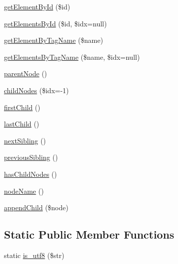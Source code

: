 \begin{DoxyCompactItemize}
\hyperlink{classsimple__html__dom__node_aec6ca41b9859728595ece521ca638e48}{get\+Element\+By\+Id} (\$id)
\item 
\hyperlink{classsimple__html__dom__node_a12433180a44804217a6089284c1e337a}{get\+Elements\+By\+Id} (\$id, \$idx=null)
\item 
\hyperlink{classsimple__html__dom__node_a73eb6caf89c86044a5ed0092484f375d}{get\+Element\+By\+Tag\+Name} (\$name)
\item 
\hyperlink{classsimple__html__dom__node_a7d6c89e0ea53cd3866bb03eac8ef300d}{get\+Elements\+By\+Tag\+Name} (\$name, \$idx=null)
\item 
\hyperlink{classsimple__html__dom__node_a38cacd4491f3f41cf275df362bb64c06}{parent\+Node} ()
\item 
\hyperlink{classsimple__html__dom__node_a543b9f022b4d71d19a8f055b3b87bb77}{child\+Nodes} (\$idx=-\/1)
\item 
\hyperlink{classsimple__html__dom__node_a2e7ff3e4db465652634f86004ccb83db}{first\+Child} ()
\item 
\hyperlink{classsimple__html__dom__node_aa290d153aa9b41988d2b4bfb23424241}{last\+Child} ()
\item 
\hyperlink{classsimple__html__dom__node_a6ef403032300227cea0cbd91e4ddccba}{next\+Sibling} ()
\item 
\hyperlink{classsimple__html__dom__node_abd98231235f474bb5a4457715cdbd333}{previous\+Sibling} ()
\item 
\hyperlink{classsimple__html__dom__node_af364b2c56fa29308bdc66b8a6b2b8d3b}{has\+Child\+Nodes} ()
\item 
\hyperlink{classsimple__html__dom__node_afd68aa0cdee9735a7b13891300f4891b}{node\+Name} ()
\item 
\hyperlink{classsimple__html__dom__node_ae1d4fc95e0556bcc5970086f5c24aa3e}{append\+Child} (\$node)
\end{DoxyCompactItemize}
\subsection*{Static Public Member Functions}
\begin{DoxyCompactItemize}
\item 
static \hyperlink{classsimple__html__dom__node_a9db7f469edd3ce17a39da2cd21fd0a7a}{is\+\_\+utf8} (\$str)
\end{DoxyCompactItemize}
